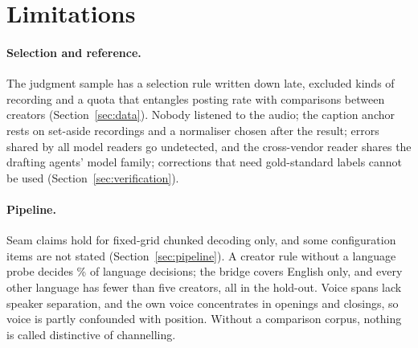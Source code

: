 
\section{Limitations}
\label{sec:limits}

\paragraph{Selection and reference.} The judgment sample has a selection rule written down late, excluded kinds of recording and a quota that entangles posting rate with comparisons between creators (Section~\ref{sec:data}). Nobody listened to the audio; the caption anchor rests on set-aside recordings and a normaliser chosen after the result; errors shared by all model readers go undetected, and the cross-vendor reader shares the drafting agents' model family; corrections that need gold-standard labels cannot be used (Section~\ref{sec:verification}).

\paragraph{Pipeline.} Seam claims hold for fixed-grid chunked decoding only, and some configuration items are not stated (Section~\ref{sec:pipeline}). A creator rule without a language probe decides \LangCreatorRulePct\% of language decisions; the bridge covers English only, and every other language has fewer than five creators, all in the hold-out. Voice spans lack speaker separation, and the own voice concentrates in openings and closings, so voice is partly confounded with position. Without a comparison corpus, nothing is called distinctive of channelling.

